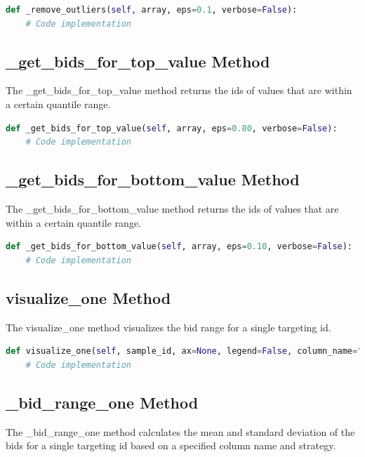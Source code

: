 \begin{lstlisting}[language=Python]
def _remove_outliers(self, array, eps=0.1, verbose=False):
    # Code implementation
\end{lstlisting}

\subsection{\_get\_bids\_for\_top\_value Method}

The \_get\_bids\_for\_top\_value method returns the ids of values that are within a certain quantile range.

\begin{lstlisting}[language=Python]
def _get_bids_for_top_value(self, array, eps=0.80, verbose=False):
    # Code implementation
\end{lstlisting}

\subsection{\_get\_bids\_for\_bottom\_value Method}

The \_get\_bids\_for\_bottom\_value method returns the ids of values that are within a certain quantile range.

\begin{lstlisting}[language=Python]
def _get_bids_for_bottom_value(self, array, eps=0.10, verbose=False):
    # Code implementation
\end{lstlisting}

\subsection{visualize\_one Method}

The visualize\_one method visualizes the bid range for a single targeting id.

\begin{lstlisting}[language=Python]
def visualize_one(self, sample_id, ax=None, legend=False, column_name="sales", strategy="maximize", data_return_type="mean_std", remove_outliers=True):
    # Code implementation
\end{lstlisting}

\subsection{\_bid\_range\_one Method}

The \_bid\_range\_one method calculates the mean and standard deviation of the bids for a single targeting id based on a specified column name and strategy.

